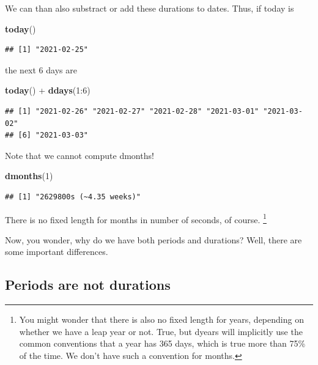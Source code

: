 \documentclass[]{tufte-book}
\newenvironment{Shaded}{}{}
\newcommand{\DecValTok}[1]{\textcolor[rgb]{0.25,0.63,0.44}{#1}}
\newcommand{\KeywordTok}[1]{\textcolor[rgb]{0.00,0.44,0.13}{\textbf{#1}}}
\newcommand{\NormalTok}[1]{#1}
\newcommand{\OperatorTok}[1]{\textcolor[rgb]{0.40,0.40,0.40}{#1}}
\newcommand{\StringTok}[1]{\textcolor[rgb]{0.25,0.44,0.63}{#1}}
\begin{document}
We can than also substract or add these durations to dates. Thus, if today is

\begin{Shaded}
\begin{Highlighting}[]
\KeywordTok{today}\NormalTok{()}
\end{Highlighting}
\end{Shaded}

\begin{verbatim}
## [1] "2021-02-25"
\end{verbatim}

the next 6 days are

\begin{Shaded}
\begin{Highlighting}[]
\KeywordTok{today}\NormalTok{() }\OperatorTok{+}\StringTok{ }\KeywordTok{ddays}\NormalTok{(}\DecValTok{1}\OperatorTok{:}\DecValTok{6}\NormalTok{)}
\end{Highlighting}
\end{Shaded}

\begin{verbatim}
## [1] "2021-02-26" "2021-02-27" "2021-02-28" "2021-03-01" "2021-03-02"
## [6] "2021-03-03"
\end{verbatim}

Note that we cannot compute dmonths!

\begin{Shaded}
\begin{Highlighting}[]
\KeywordTok{dmonths}\NormalTok{(}\DecValTok{1}\NormalTok{)}
\end{Highlighting}
\end{Shaded}

\begin{verbatim}
## [1] "2629800s (~4.35 weeks)"
\end{verbatim}

There is no fixed length for months in number of seconds, of course. \footnote{You might wonder that there is also no fixed length for years, depending on whether we have a leap year or not. True, but dyears will implicitly use the common conventions that a year has 365 days, which is true more than 75\% of the time. We don't have such a convention for months.}

Now, you wonder, why do we have both periods and durations? Well, there are some important differences.

\hypertarget{periods-are-not-durations}{%
\subsection{Periods are not durations}\label{periods-are-not-durations}}
\end{document}
